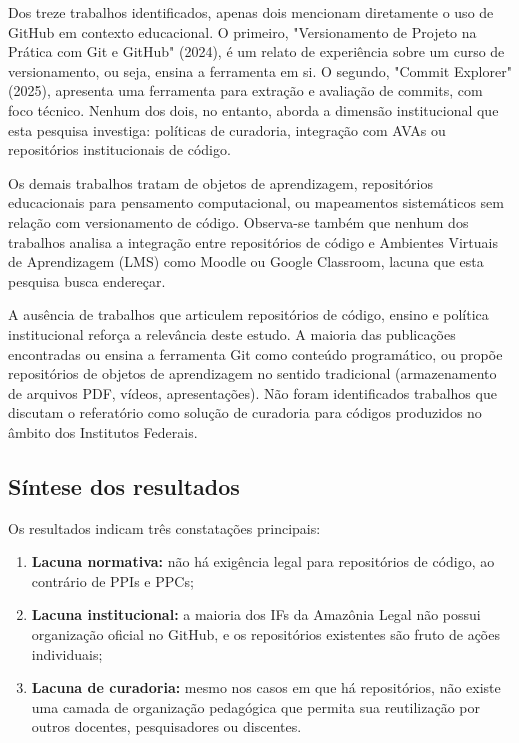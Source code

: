 \documentclass[english, spanish, brazilian]{RBIEarticle}
\begin{document}
	Dos treze trabalhos identificados, apenas dois mencionam diretamente o uso de GitHub em contexto educacional. O primeiro, "Versionamento de Projeto na Prática com Git e GitHub" (2024), é um relato de experiência sobre um curso de versionamento, ou seja, ensina a ferramenta em si. O segundo, "Commit Explorer" (2025), apresenta uma ferramenta para extração e avaliação de commits, com foco técnico. Nenhum dos dois, no entanto, aborda a dimensão institucional que esta pesquisa investiga: políticas de curadoria, integração com AVAs ou repositórios institucionais de código.
	
	Os demais trabalhos tratam de objetos de aprendizagem, repositórios educacionais para pensamento computacional, ou mapeamentos sistemáticos sem relação com versionamento de código. Observa-se também que nenhum dos trabalhos analisa a integração entre repositórios de código e Ambientes Virtuais de Aprendizagem (LMS) como Moodle ou Google Classroom, lacuna que esta pesquisa busca endereçar.
	
	A ausência de trabalhos que articulem repositórios de código, ensino e política institucional reforça a relevância deste estudo. A maioria das publicações encontradas ou ensina a ferramenta Git como conteúdo programático, ou propõe repositórios de objetos de aprendizagem no sentido tradicional (armazenamento de arquivos PDF, vídeos, apresentações). Não foram identificados trabalhos que discutam o referatório como solução de curadoria para códigos produzidos no âmbito dos Institutos Federais.
	
	\subsection{Síntese dos resultados}
	
	Os resultados indicam três constatações principais:
	
	\begin{enumerate}
		\item \textbf{Lacuna normativa:} não há exigência legal para repositórios de código, ao contrário de PPIs e PPCs;
		\item \textbf{Lacuna institucional:} a maioria dos IFs da Amazônia Legal não possui organização oficial no GitHub, e os repositórios existentes são fruto de ações individuais;
		\item \textbf{Lacuna de curadoria:} mesmo nos casos em que há repositórios, não existe uma camada de organização pedagógica que permita sua reutilização por outros docentes, pesquisadores ou discentes.
	\end{enumerate}
	
\end{document}
